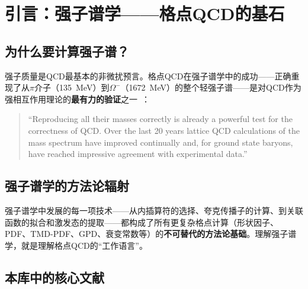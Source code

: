 \documentclass[12pt,a4paper]{ctexart}
\theoremstyle{definition}
\begin{document}
\tableofcontents
\newpage

\section{引言：强子谱学——格点QCD的基石}

\subsection{为什么要计算强子谱？}

强子质量是QCD最基本的非微扰预言。格点QCD在强子谱学中的成功——正确重现了从$\pi$介子（135~MeV）到$\Omega^-$（1672~MeV）的整个轻强子谱——是对QCD作为强相互作用理论的\textbf{最有力的验证}之一~\cite{GattringerLang2010}：
\begin{quote}
``Reproducing all their masses correctly is already a powerful test for the correctness of QCD. Over the last 20 years lattice QCD calculations of the mass spectrum have improved continually and, for ground state baryons, have reached impressive agreement with experimental data.''~\cite{GattringerLang2010}
\end{quote}

\subsection{强子谱学的方法论辐射}

强子谱学中发展的每一项技术——从内插算符的选择、夸克传播子的计算、到关联函数的拟合和激发态的提取——都构成了所有更复杂格点计算（形状因子、PDF、TMD-PDF、GPD、衰变常数等）的\textbf{不可替代的方法论基础}。理解强子谱学，就是理解格点QCD的``工作语言''。

\subsection{本库中的核心文献}
\end{document}
